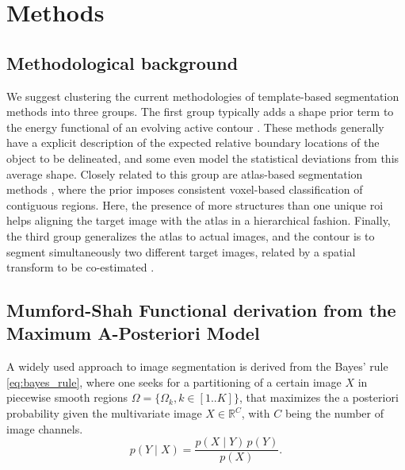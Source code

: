 \section{Methods}
\label{sec:methods}
%
\subsection{Methodological background}
\label{sec:methods_background}

We suggest clustering the current methodologies of template-based segmentation 
methods into three groups. The first group typically adds a shape prior term to 
the energy functional of an evolving active contour
\citep{bresson_variational_2006,chan_level_2005,chen_using_2002,cremers_kernel_2006,
gastaud_combining_2004,paragios_level_2003,vemuri_joint_2003,yezzi_variational_2003}.
These methods generally have a explicit description of the expected relative boundary 
locations of the object to be delineated, and some even model the statistical deviations
from this average shape. Closely related to this group are atlas-based segmentation
methods \citep{gorthi_segmentation_2009,gorthi_active_2011,pohl_unifying_2005,
pohl_bayesian_2006,wang_joint_2006}, where the prior 
imposes consistent voxel-based classification of contiguous regions. Here, the 
presence of more structures than one unique \gls{roi} helps aligning the target image 
with the atlas in a hierarchical fashion. Finally, the third group generalizes 
the atlas to actual images, and the contour is to segment simultaneously two 
different target images, related by a spatial transform to be co-estimated
\citep{wyatt_map_2003,yezzi_variational_2003}.

\subsection{Mumford-Shah Functional derivation from the Maximum A-Posteriori Model}
\label{sec:methods_map}
%
A widely used approach to image segmentation is derived from the
Bayes' rule \eqref{eq:bayes_rule}, where one seeks for a partitioning
of a certain image $X$ in piecewise smooth regions $\Omega = \lbrace \Omega_k , 
k\in\left[ 1 .. K \right] \rbrace$,  that maximizes the a posteriori 
probability given the multivariate image $X \in \mathbb{R}^C$, 
with $C$ being the number of image channels.
\begin{equation}
p(Y \mid X) = \frac{p(X \mid Y)\, p(Y)}{p(X)}.
\label{eq:bayes_rule}
\end{equation}

